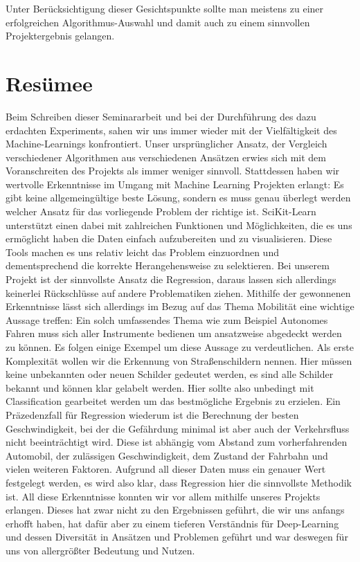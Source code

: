Unter Berücksichtigung dieser Gesichtspunkte sollte man meistens zu einer erfolgreichen Algorithmus-Auswahl und damit auch zu einem sinnvollen Projektergebnis gelangen.

\chapter{Resümee}
\label{resümee}
Beim Schreiben dieser Seminararbeit und bei der Durchführung des dazu erdachten Experiments, sahen wir uns immer wieder mit der Vielfältigkeit des Machine-Learnings konfrontiert. 
Unser ursprünglicher Ansatz, der Vergleich verschiedener Algorithmen aus verschiedenen Ansätzen erwies sich mit dem Voranschreiten des Projekts als immer weniger sinnvoll.
Stattdessen haben wir wertvolle Erkenntnisse im Umgang mit Machine Learning Projekten erlangt:
Es gibt keine allgemeingültige beste Lösung, sondern es muss genau überlegt werden welcher Ansatz für das vorliegende Problem der richtige ist. SciKit-Learn unterstützt einen dabei mit zahlreichen Funktionen und Möglichkeiten, die es uns ermöglicht haben die Daten einfach aufzubereiten und zu visualisieren. Diese Tools machen es uns relativ leicht das Problem einzuordnen und dementsprechend die korrekte Herangehensweise zu selektieren.
Bei unserem Projekt ist der sinnvollste Ansatz die Regression, daraus lassen sich allerdings keinerlei Rückschlüsse auf andere Problematiken ziehen.
Mithilfe der gewonnenen Erkenntnisse lässt sich allerdings im Bezug auf das Thema Mobilität eine wichtige Aussage treffen: 
Ein solch umfassendes Thema wie zum Beispiel Autonomes Fahren muss sich aller Instrumente bedienen um ansatzweise abgedeckt werden zu können. Es folgen einige Exempel um diese Aussage zu verdeutlichen.
Als erste Komplexität wollen wir die Erkennung von Straßenschildern nennen. Hier müssen keine unbekannten oder neuen Schilder gedeutet werden, es sind alle Schilder bekannt und können klar gelabelt werden. Hier sollte also unbedingt mit Classification gearbeitet werden um das bestmögliche Ergebnis zu erzielen.
Ein Präzedenzfall für Regression wiederum ist die Berechnung der besten Geschwindigkeit, bei der die Gefährdung minimal ist aber auch der Verkehrsfluss nicht beeinträchtigt wird. Diese ist abhängig vom Abstand zum vorherfahrenden Automobil, der zulässigen Geschwindigkeit, dem Zustand der Fahrbahn und vielen weiteren Faktoren. Aufgrund all dieser Daten muss ein genauer Wert festgelegt werden, es wird also klar, dass Regression hier die sinnvollste Methodik ist. 
All diese Erkenntnisse konnten wir vor allem mithilfe unseres Projekts erlangen. Dieses hat zwar nicht zu den Ergebnissen geführt, die wir uns anfangs erhofft haben, hat dafür aber zu einem tieferen Verständnis für Deep-Learning und dessen Diversität in Ansätzen und Problemen geführt und war deswegen für uns von allergrößter Bedeutung und Nutzen.





































